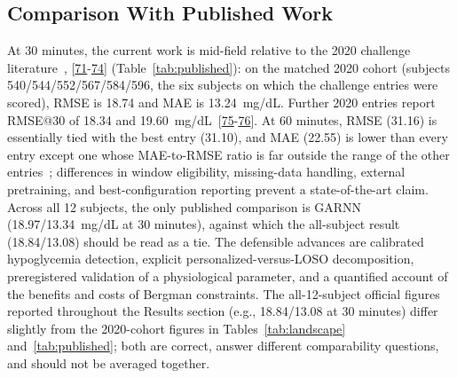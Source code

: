 \documentclass[journal]{IEEEtran}
\begin{document}
\subsection{Comparison With Published Work}

At 30 minutes, the current work is mid-field relative to the 2020 challenge literature~\cite{ref64}, [\hyperref[ref60label]{71}-\hyperref[ref63label]{74}] (Table~\ref{tab:published}): on the matched 2020 cohort (subjects 540/544/552/567/584/596, the six subjects on which the challenge entries were scored), RMSE is 18.74 and MAE is 13.24~mg/dL. Further 2020 entries report RMSE@30 of 18.34 and 19.60~mg/dL~[\hyperref[ref65label]{75}-\hyperref[ref70label]{76}]. At 60 minutes, RMSE (31.16) is essentially tied with the best entry (31.10), and MAE (22.55) is lower than every entry except one whose MAE-to-RMSE ratio is far outside the range of the other entries~\cite{ref60}; differences in window eligibility, missing-data handling, external pretraining, and best-configuration reporting prevent a state-of-the-art claim. Across all 12 subjects, the only published comparison is GARNN~\cite{ref75} (18.97/13.34~mg/dL at 30 minutes), against which the all-subject result (18.84/13.08) should be read as a tie. The defensible advances are calibrated hypoglycemia detection, explicit personalized-versus-LOSO decomposition, preregistered validation of a physiological parameter, and a quantified account of the benefits and costs of Bergman constraints. The all-12-subject official figures reported throughout the Results section (e.g., 18.84/13.08 at 30 minutes) differ slightly from the 2020-cohort figures in Tables~\ref{tab:landscape} and~\ref{tab:published}; both are correct, answer different comparability questions, and should not be averaged together.
\end{document}
